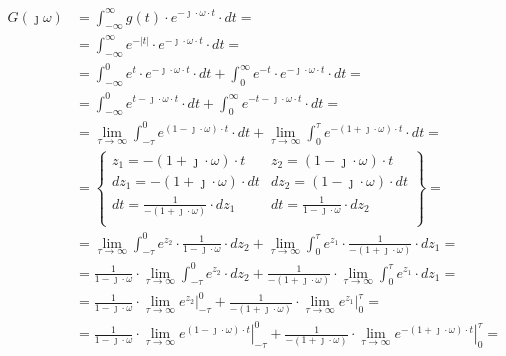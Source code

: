 \begin{task}
\begin{align*}
G(\jmath \omega)&=\int_{-\infty}^{\infty} g(t) \cdot e^{-\jmath \cdot \omega \cdot t} \cdot dt=\\
&=\int_{-\infty}^{\infty} e^{-\left|t\right|} \cdot e^{-\jmath \cdot \omega \cdot t}\cdot dt=\\
&=\int_{-\infty}^{0} e^{t} \cdot e^{-\jmath \cdot \omega \cdot t}\cdot dt + \int_{0}^{\infty} e^{-t} \cdot e^{-\jmath \cdot \omega \cdot t}\cdot dt=\\
&=\int_{-\infty}^{0} e^{t -\jmath \cdot \omega \cdot t}\cdot dt + \int_{0}^{\infty} e^{-t -\jmath \cdot \omega \cdot t}\cdot dt=\\
&=\lim_{\tau \rightarrow \infty} \int_{-\tau}^{0} e^{\left(1-\jmath \cdot \omega \right)\cdot t}\cdot dt + \lim_{\tau \rightarrow \infty} \int_{0}^{\tau} e^{-\left(1 +\jmath \cdot \omega \right)\cdot t}\cdot dt=\\
&=\begin{Bmatrix}
z_1=-\left(1+\jmath \cdot \omega \right)\cdot t & z_2 = \left(1-\jmath \cdot \omega \right)\cdot t\\
dz_1=-\left(1+\jmath \cdot \omega \right)\cdot dt & dz_2 = \left(1-\jmath \cdot \omega \right)\cdot dt\\
dt=\frac{1}{-\left(1+\jmath \cdot \omega \right)}\cdot dz_1 & dt = \frac{1}{1-\jmath \cdot \omega}\cdot dz_2\\
\end{Bmatrix}=\\
&=\lim_{\tau \rightarrow \infty} \int_{-\tau}^{0} e^{z_2}\cdot \frac{1}{1-\jmath \cdot \omega }\cdot dz_2 + \lim_{\tau \rightarrow \infty} \int_{0}^{\tau} e^{z_1}\cdot \frac{1}{-\left(1+\jmath \cdot \omega\right)}\cdot dz_1=\\
&=\frac{1}{1-\jmath \cdot \omega }\cdot \lim_{\tau \rightarrow \infty} \int_{-\tau}^{0} e^{z_2}\cdot dz_2 + \frac{1}{-\left(1+\jmath \cdot \omega\right)}\cdot \lim_{\tau \rightarrow \infty} \int_{0}^{\tau} e^{z_1}\cdot  dz_1=\\
&=\frac{1}{1-\jmath \cdot \omega}\cdot \lim_{\tau \rightarrow \infty} \left. e^{z_2}\right|_{-\tau}^{0} + \frac{1}{-\left(1+\jmath \cdot \omega\right)}\cdot \lim_{\tau \rightarrow \infty} \left. e^{z_1}\right|_{0}^{\tau}=\\
&=\frac{1}{1-\jmath \cdot \omega }\cdot \lim_{\tau \rightarrow \infty} \left. e^{\left(1-\jmath \cdot \omega \right)\cdot t}\right|_{-\tau}^{0} + \frac{1}{-\left(1+\jmath \cdot \omega\right)}\cdot \lim_{\tau \rightarrow \infty} \left. e^{-\left(1+\jmath \cdot \omega \right)\cdot t}\right|_{0}^{\tau}=\\

\end{align*}
\end{task}
